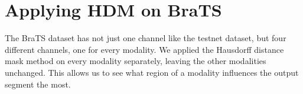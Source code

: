\section{Applying HDM on BraTS}

The BraTS dataset has not just one channel like the testnet dataset, but four different channels, one for every modality. We applied the Hausdorff distance mask method on every modality
separately, leaving the other modalities unchanged. This allows us to see what region of a modality influences the output segment the most.